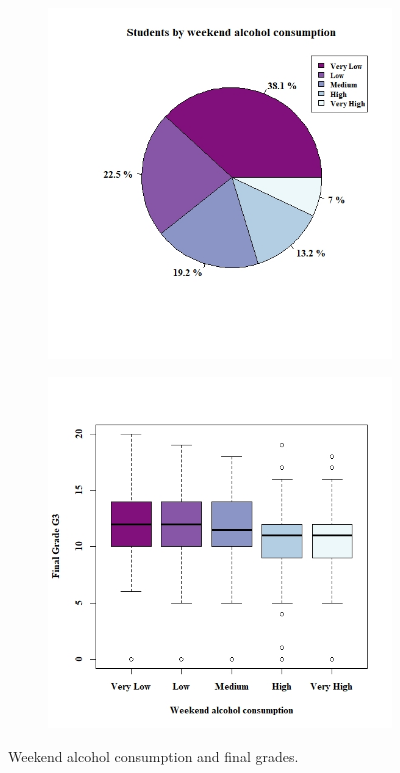 \documentclass[a4paper, 11pt]{article}
\begin{document}
	\begin{figure}[h!]
		\centering
		\begin{subfigure}[b]{0.4\linewidth}
			\hspace*{-1.2in}
			\includegraphics[width=1.5\linewidth]{weekend_alcohol.jpeg}
		\end{subfigure}
		\begin{subfigure}[b]{0.4\linewidth}
			\includegraphics[width=1.5\linewidth]{weekend_alcohol_grades.jpeg}
		\end{subfigure}
		\caption*{Weekend alcohol consumption and final grades.}
		\label{fig:weekend_alcohol_grades}
	\end{figure}
	
\end{document}
